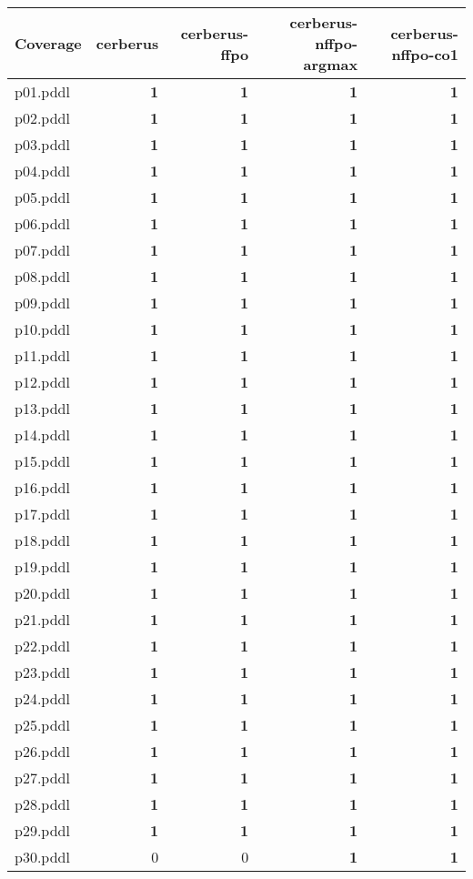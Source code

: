 \documentclass{article}
\begin{document}
\begin{tabular}{@{}lrrrr@{}}
Coverage & cerberus & cerberus-ffpo & cerberus-nffpo-argmax & cerberus-nffpo-co1 \\
\midrule
p01.pddl & \textbf{1} & \textbf{1} & \textbf{1} & \textbf{1} \\
p02.pddl & \textbf{1} & \textbf{1} & \textbf{1} & \textbf{1} \\
p03.pddl & \textbf{1} & \textbf{1} & \textbf{1} & \textbf{1} \\
p04.pddl & \textbf{1} & \textbf{1} & \textbf{1} & \textbf{1} \\
p05.pddl & \textbf{1} & \textbf{1} & \textbf{1} & \textbf{1} \\
p06.pddl & \textbf{1} & \textbf{1} & \textbf{1} & \textbf{1} \\
p07.pddl & \textbf{1} & \textbf{1} & \textbf{1} & \textbf{1} \\
p08.pddl & \textbf{1} & \textbf{1} & \textbf{1} & \textbf{1} \\
p09.pddl & \textbf{1} & \textbf{1} & \textbf{1} & \textbf{1} \\
p10.pddl & \textbf{1} & \textbf{1} & \textbf{1} & \textbf{1} \\
p11.pddl & \textbf{1} & \textbf{1} & \textbf{1} & \textbf{1} \\
p12.pddl & \textbf{1} & \textbf{1} & \textbf{1} & \textbf{1} \\
p13.pddl & \textbf{1} & \textbf{1} & \textbf{1} & \textbf{1} \\
p14.pddl & \textbf{1} & \textbf{1} & \textbf{1} & \textbf{1} \\
p15.pddl & \textbf{1} & \textbf{1} & \textbf{1} & \textbf{1} \\
p16.pddl & \textbf{1} & \textbf{1} & \textbf{1} & \textbf{1} \\
p17.pddl & \textbf{1} & \textbf{1} & \textbf{1} & \textbf{1} \\
p18.pddl & \textbf{1} & \textbf{1} & \textbf{1} & \textbf{1} \\
p19.pddl & \textbf{1} & \textbf{1} & \textbf{1} & \textbf{1} \\
p20.pddl & \textbf{1} & \textbf{1} & \textbf{1} & \textbf{1} \\
p21.pddl & \textbf{1} & \textbf{1} & \textbf{1} & \textbf{1} \\
p22.pddl & \textbf{1} & \textbf{1} & \textbf{1} & \textbf{1} \\
p23.pddl & \textbf{1} & \textbf{1} & \textbf{1} & \textbf{1} \\
p24.pddl & \textbf{1} & \textbf{1} & \textbf{1} & \textbf{1} \\
p25.pddl & \textbf{1} & \textbf{1} & \textbf{1} & \textbf{1} \\
p26.pddl & \textbf{1} & \textbf{1} & \textbf{1} & \textbf{1} \\
p27.pddl & \textbf{1} & \textbf{1} & \textbf{1} & \textbf{1} \\
p28.pddl & \textbf{1} & \textbf{1} & \textbf{1} & \textbf{1} \\
p29.pddl & \textbf{1} & \textbf{1} & \textbf{1} & \textbf{1} \\
p30.pddl & 0 & 0 & \textbf{1} & \textbf{1} \\
\end{tabular}
\end{document}
